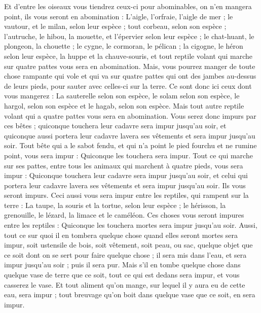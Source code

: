 \begin{multicols}{2}
Et d'entre les oiseaux vous tiendrez ceux-ci pour abominables, on n'en mangera point, ils vous seront en abomination : L'aigle, l'orfraie, l'aigle de mer ;
le vautour, et le milan, selon leur espèce ;
tout corbeau, selon son espèce ;
l'autruche, le hibou, la mouette, et l'épervier selon leur espèce ;
le chat-huant, le plongeon, la chouette ;
le cygne, le cormoran, le pélican ;
la cigogne, le héron selon leur espèce, la huppe et la chauve-souris,
et tout reptile volant qui marche sur quatre pattes vous sera en abomination.
Mais, vous pourrez manger de toute chose rampante qui vole et qui va sur quatre pattes qui ont des jambes au-dessus de leurs pieds, pour sauter avec celles-ci sur la terre.
Ce sont donc ici ceux dont vous mangerez : La sauterelle selon son espèce, le solam selon son espèce, le hargol, selon son espèce et le hagab, selon son espèce.
Mais tout autre reptile volant qui a quatre pattes vous sera en abomination.
Vous serez donc impurs par ces bêtes ; quiconque touchera leur cadavre sera impur jusqu'au soir,
et quiconque aussi portera leur cadavre lavera ses vêtements et sera impur jusqu'au soir.
Tout bête qui a le sabot fendu, et qui n'a point le pied fourchu et ne rumine point, vous sera impur : Quiconque les touchera sera impur.
Tout ce qui marche sur ses pattes, entre tous les animaux qui marchent à quatre pieds, vous sera impur : Quiconque touchera leur cadavre sera impur jusqu'au soir,
et celui qui portera leur cadavre lavera ses vêtements et sera impur jusqu'au soir. Ils vous seront impurs.
Ceci aussi vous sera impur entre les reptiles, qui rampent sur la terre : La taupe, la souris et la tortue, selon leur espèce ;
le hérisson, la grenouille, le lézard, la limace et le caméléon.
Ces choses vous seront impures entre les reptiles : Quiconque les touchera mortes sera impur jusqu'au soir.
Aussi, tout ce sur quoi il en tombera quelque chose quand elles seront mortes sera impur, soit ustensile de bois, soit vêtement, soit peau, ou sac, quelque objet que ce soit dont on se sert pour faire quelque chose ; il sera mis dans l'eau, et sera impur jusqu'au soir ; puis il sera pur.
Mais s'il en tombe quelque chose dans quelque vase de terre que ce soit, tout ce qui est dedans sera impur, et vous casserez le vase.
Et tout aliment qu'on mange, sur lequel il y aura eu de cette eau, sera impur ; tout breuvage qu'on boit dans quelque vase que ce soit, en sera impur.

\end{multicols}
